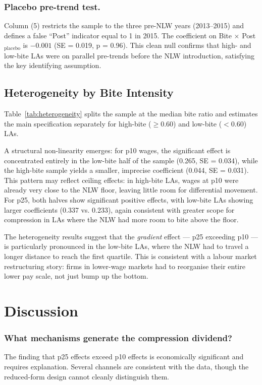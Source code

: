 \documentclass[12pt]{article}
\begin{document}
\subsubsection*{Placebo pre-trend test.}
Column (5) restricts the sample to the three pre-NLW years (2013--2015) and defines a false ``Post'' indicator equal to 1 in 2015. The coefficient on Bite $\times$ Post$_{\text{placebo}}$ is $-0.001$ (SE = 0.019, p = 0.96). This clean null confirms that high- and low-bite LAs were on parallel pre-trends before the NLW introduction, satisfying the key identifying assumption.

\subsection{Heterogeneity by Bite Intensity}

Table~\ref{tab:heterogeneity} splits the sample at the median bite ratio and estimates the main specification separately for high-bite ($\geq 0.60$) and low-bite ($< 0.60$) LAs.



A structural non-linearity emerges: for p10 wages, the significant effect is concentrated entirely in the low-bite half of the sample (0.265, SE = 0.034), while the high-bite sample yields a smaller, imprecise coefficient (0.044, SE = 0.031). This pattern may reflect ceiling effects: in high-bite LAs, wages at p10 were already very close to the NLW floor, leaving little room for differential movement. For p25, both halves show significant positive effects, with low-bite LAs showing larger coefficients (0.337 vs. 0.233), again consistent with greater scope for compression in LAs where the NLW had more room to bite above the floor.

The heterogeneity results suggest that the \textit{gradient} effect --- p25 exceeding p10 --- is particularly pronounced in the low-bite LAs, where the NLW had to travel a longer distance to reach the first quartile. This is consistent with a labour market restructuring story: firms in lower-wage markets had to reorganise their entire lower pay scale, not just bump up the bottom.

\section{Discussion}
\label{sec:discussion}

\subsubsection*{What mechanisms generate the compression dividend?}
The finding that p25 effects exceed p10 effects is economically significant and requires explanation. Several channels are consistent with the data, though the reduced-form design cannot cleanly distinguish them.
\end{document}
